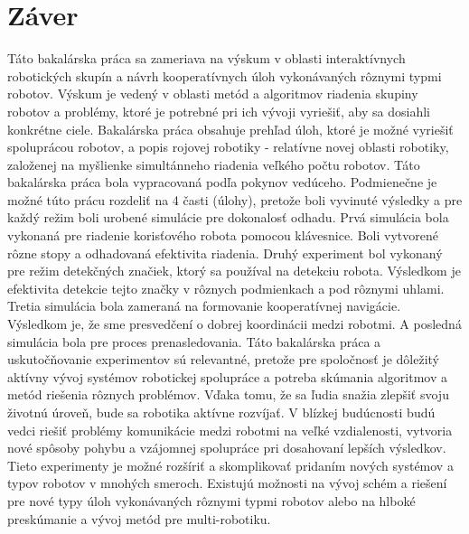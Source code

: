 \section{Z\'aver}


Táto bakalárska práca sa zameriava na výskum v oblasti interaktívnych robotických skupín a návrh kooperatívnych úloh vykonávaných rôznymi typmi robotov. Výskum je vedený v oblasti metód a algoritmov riadenia skupiny robotov
a problémy, ktoré je potrebné pri ich vývoji vyriešiť, aby sa dosiahli konkrétne ciele. Bakalárska práca obsahuje prehľad úloh, ktoré je možné vyriešiť spoluprácou robotov, a popis rojovej robotiky - relatívne novej oblasti robotiky, založenej na myšlienke simultánneho riadenia veľkého počtu robotov.
Táto bakalárska práca bola vypracovaná podľa pokynov vedúceho. Podmienečne je možné túto prácu rozdeliť na 4 časti (úlohy), pretože boli vyvinuté výsledky a pre každý režim boli urobené simulácie pre dokonalosť odhadu.
Prvá simulácia bola vykonaná pre riadenie korisťového robota pomocou klávesnice. Boli vytvorené rôzne stopy a odhadovaná efektivita riadenia.
Druhý experiment bol vykonaný pre režim detekčných značiek, ktorý sa používal na detekciu robota. Výsledkom je efektivita detekcie tejto značky v rôznych podmienkach a pod rôznymi uhlami.
Tretia simulácia bola zameraná na formovanie kooperatívnej navigácie. Výsledkom je, že sme presvedčení o dobrej koordinácii medzi robotmi.
A posledná simulácia bola pre proces prenasledovania.
Táto bakalárska práca a uskutočňovanie experimentov sú relevantné, pretože pre spoločnosť je dôležitý aktívny vývoj systémov robotickej spolupráce a potreba skúmania algoritmov a metód riešenia rôznych problémov. Vďaka tomu, že sa ľudia snažia zlepšiť svoju životnú úroveň, bude sa robotika aktívne rozvíjať. V blízkej budúcnosti budú vedci riešiť problémy komunikácie medzi robotmi na veľké vzdialenosti, vytvoria nové spôsoby pohybu a vzájomnej spolupráce pri dosahovaní lepších výsledkov. Tieto experimenty je možné rozšíriť a skomplikovať pridaním nových systémov a typov robotov v mnohých smeroch. Existujú možnosti na vývoj schém a riešení pre nové typy úloh vykonávaných rôznymi typmi robotov alebo na hlboké preskúmanie a vývoj metód pre multi-robotiku.
